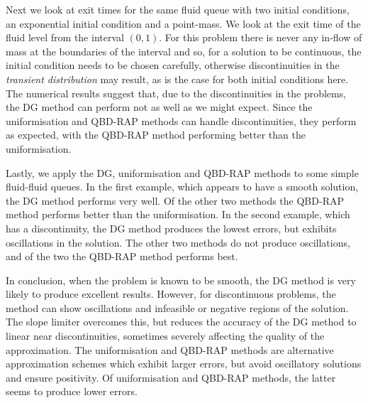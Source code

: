 Next we look at exit times for the same fluid queue with two initial conditions, an exponential initial condition and a point-mass. We look at the exit time of the fluid level from the interval \((0,1)\). For this problem there is never any in-flow of mass at the boundaries of the interval and so, for a solution to be continuous, the initial condition needs to be chosen carefully, otherwise discontinuities in the \textit{transient distribution} may result, as is the case for both initial conditions here. The numerical results suggest that, due to the discontinuities in the problems, the DG method can perform not as well as we might expect. Since the uniformisation and QBD-RAP methods can handle discontinuities, they perform as expected, with the QBD-RAP method performing better than the uniformisation. 

Lastly, we apply the DG, uniformisation and QBD-RAP methods to some simple fluid-fluid queues. In the first example, which appears to have a smooth solution, the DG method performs very well. Of the other two methods the QBD-RAP method performs better than the uniformisation. In the second example, which has a discontinuity, the DG method produces the lowest errors, but exhibits oscillations in the solution. The other two methods do not produce oscillations, and of the two the QBD-RAP method performs best. 

In conclusion, when the problem is known to be smooth, the DG method is very likely to produce excellent results. However, for discontinuous problems, the method can show oscillations and infeasible or negative regions of the solution. The slope limiter overcomes this, but reduces the accuracy of the DG method to linear near discontinuities, sometimes severely affecting the quality of the approximation. The uniformisation and QBD-RAP methods are alternative approximation schemes which exhibit larger errors, but avoid oscillatory solutions and ensure positivity. Of uniformisation and QBD-RAP methods, the latter seems to produce lower errors. 

